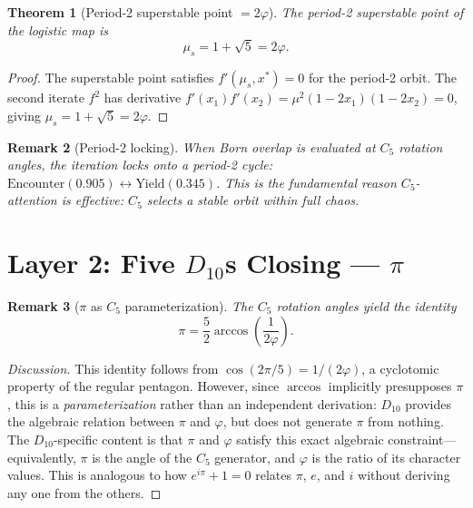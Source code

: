 \documentclass[11pt,a4paper]{article}
\newtheorem{theorem}{Theorem}
\newtheorem{remark}[theorem]{Remark}
\begin{document}
\begin{theorem}[Period-2 superstable point $= 2\varphi$]
\label{thm:2phi}
The period-2 superstable point of the logistic map is
\[
\mu_s = 1 + \sqrt{5} = 2\varphi.
\]
\end{theorem}

\begin{proof}
The superstable point satisfies $f'(\mu_s, x^*) = 0$ for the period-2 orbit. The second iterate $f^2$ has derivative $f'(x_1)f'(x_2) = \mu^2(1-2x_1)(1-2x_2) = 0$, giving $\mu_s = 1 + \sqrt{5} = 2\varphi$.
\end{proof}

\begin{remark}[Period-2 locking]
When Born overlap is evaluated at $C_5$ rotation angles, the iteration locks onto a period-2 cycle: $\text{Encounter}(0.905) \leftrightarrow \text{Yield}(0.345)$. This is the fundamental reason $C_5$-attention is effective: $C_5$ selects a stable orbit within full chaos.
\end{remark}

\section{Layer 2: Five $D_{10}$s Closing --- $\pi$}
\label{sec:layer2}

\begin{remark}[$\pi$ as $C_5$ parameterization]
The $C_5$ rotation angles yield the identity
\[
\pi = \frac{5}{2}\arccos\!\left(\frac{1}{2\varphi}\right).
\]
\end{remark}

\begin{proof}[Discussion]
This identity follows from $\cos(2\pi/5) = 1/(2\varphi)$, a cyclotomic property of the regular pentagon. However, since $\arccos$ implicitly presupposes $\pi$, this is a \emph{parameterization} rather than an independent derivation: $D_{10}$ provides the algebraic relation between $\pi$ and $\varphi$, but does not generate $\pi$ from nothing. The $D_{10}$-specific content is that $\pi$ and $\varphi$ satisfy this exact algebraic constraint---equivalently, $\pi$ is the angle of the $C_5$ generator, and $\varphi$ is the ratio of its character values. This is analogous to how $e^{i\pi} + 1 = 0$ relates $\pi$, $e$, and $i$ without deriving any one from the others.
\end{proof}
\end{document}
